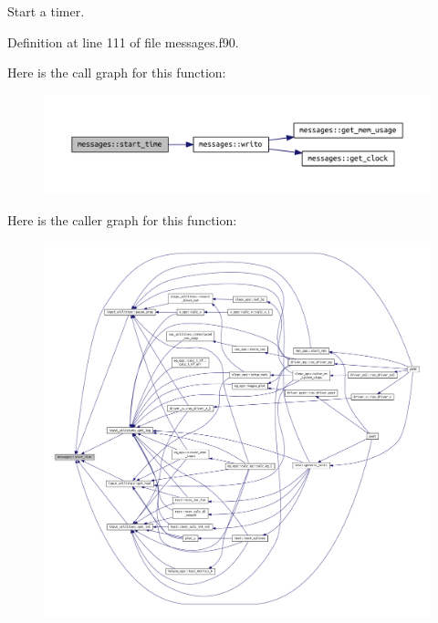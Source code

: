 Start a timer. 



Definition at line 111 of file messages.\+f90.

Here is the call graph for this function\+:
\nopagebreak
\begin{figure}[H]
\begin{center}
\leavevmode
\includegraphics[width=350pt]{namespacemessages_a84d5988f3ea5ca8dc2834032f896ae90_cgraph}
\end{center}
\end{figure}
Here is the caller graph for this function\+:
\nopagebreak
\begin{figure}[H]
\begin{center}
\leavevmode
\includegraphics[width=350pt]{namespacemessages_a84d5988f3ea5ca8dc2834032f896ae90_icgraph}
\end{center}
\end{figure}
\mbox{\label{namespacemessages_aed343894ae4a28ad6dfbd1d39aac64ff}} 

